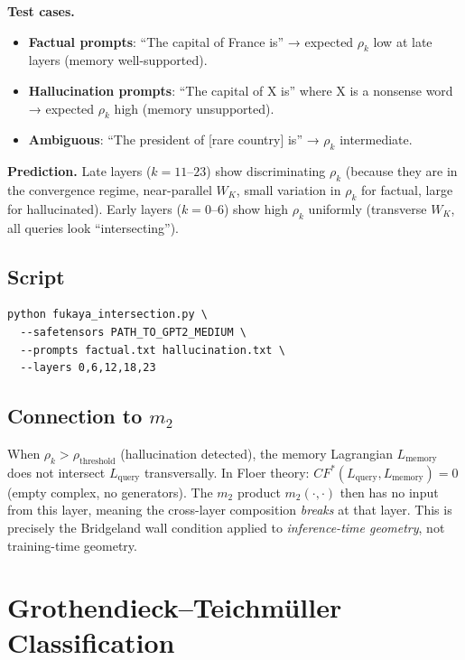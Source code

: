 \documentclass[11pt]{amsart}
\begin{document}
\textbf{Test cases.}
\begin{itemize}
\item \textbf{Factual prompts}: ``The capital of France is''
  → expected $\rho_k$ low at late layers (memory well-supported).
\item \textbf{Hallucination prompts}: ``The capital of X is'' where X
  is a nonsense word → expected $\rho_k$ high (memory unsupported).
\item \textbf{Ambiguous}: ``The president of [rare country] is''
  → $\rho_k$ intermediate.
\end{itemize}

\textbf{Prediction.}
Late layers ($k=11$--$23$) show discriminating $\rho_k$
(because they are in the convergence regime, near-parallel $W_K$,
small variation in $\rho_k$ for factual, large for hallucinated).
Early layers ($k=0$--$6$) show high $\rho_k$ uniformly
(transverse $W_K$, all queries look ``intersecting'').

\subsection{Script}

\begin{verbatim}
python fukaya_intersection.py \
  --safetensors PATH_TO_GPT2_MEDIUM \
  --prompts factual.txt hallucination.txt \
  --layers 0,6,12,18,23
\end{verbatim}

\subsection{Connection to $m_2$}

When $\rho_k > \rho_\mathrm{threshold}$ (hallucination detected),
the memory Lagrangian $L_\text{memory}$ does not intersect $L_\text{query}$
transversally.
In Floer theory: $CF^{*}(L_\text{query}, L_\text{memory}) = 0$
(empty complex, no generators).
The $m_2$ product $m_2(\cdot, \cdot)$ then has no input from this layer,
meaning the cross-layer composition \emph{breaks} at that layer.
This is precisely the Bridgeland wall condition applied to
\emph{inference-time geometry}, not training-time geometry.

\section{Grothendieck--Teichmüller Classification}
\label{sec:gt}
\end{document}

